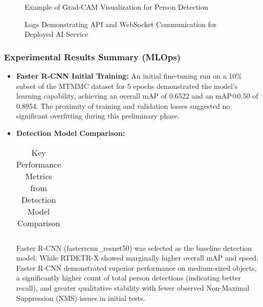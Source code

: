 \begin{figure}[!htb]
    \centering
    \caption{Example of Grad-CAM Visualization for Person Detection}
    \label{fig:progress_gradcam_example}
\end{figure}

\begin{figure}[!htb]
    \centering
    \caption{Logs Demonstrating API and WebSocket Communication for Deployed AI Service}
    \label{fig:progress_api_logs}
\end{figure}
\clearpage

\subsubsection*{Experimental Results Summary (MLOps)}
\begin{itemize}
    \item \textbf{Faster R-CNN Initial Training:} An initial fine-tuning run on a 10\% subset of the MTMMC dataset for 5 epochs demonstrated the model's learning capability, achieving an overall mAP of 0.6522 and an mAP@0.50 of 0.8954. The proximity of training and validation losses suggested no significant overfitting during this preliminary phase.
    \item \textbf{Detection Model Comparison:}
        \begin{table}[!htb]
          \centering
          \caption{Key Performance Metrics from Detection Model Comparison}
          \label{tab:progress_model_comparison_summary}
          \begin{tabular}{@{}lcc@{}}
          \end{tabular}%
        \end{table}
    
        Faster R-CNN (fasterrcnn\_resnet50) was selected as the baseline detection model. While RTDETR-X showed marginally higher overall mAP and speed, Faster R-CNN demonstrated superior performance on medium-sized objects, a significantly higher count of total person detections (indicating better recall), and greater qualitative stability with fewer observed Non-Maximal Suppression (NMS) issues in initial tests.
\end{itemize}

